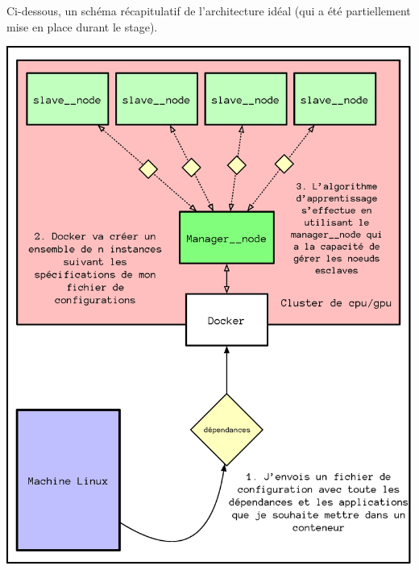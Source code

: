 Ci-dessous, un schéma récapitulatif de l'architecture idéal (qui a été partiellement mise en place durant le stage).


\begin{center}
\includegraphics[scale=.7]{./assets/interfaceReseau/interfaceResume.eps}
\end{center}
